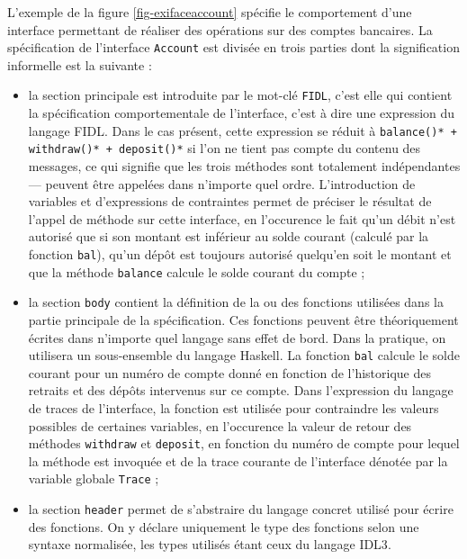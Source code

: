 L'exemple de la figure \ref{fig-exifaceaccount} sp\'ecifie le
comportement d'une interface permettant de r\'ealiser des
op\'erations sur des comptes bancaires. La
sp\'ecification de l'interface \texttt{Account} est divis\'ee en
trois parties dont la signification informelle est la suivante : 
\begin{itemize}
  \item la section principale est introduite par le mot-cl\'e
    \texttt{FIDL}, c'est elle qui contient la sp\'ecification
    comportementale de l'interface, c'est \`a dire une expression du
    langage \textsf{FIDL}. Dans le cas pr\'esent, cette expression se r\'eduit \`a
    \texttt{balance()* + withdraw()* + deposit()*}  si l'on ne tient pas
    compte du contenu des messages, ce qui signifie que les trois
    m\'ethodes sont totalement ind\'ependantes --- peuvent \^etre appel\'ees
    dans n'importe quel ordre. L'introduction de variables et
    d'expressions de contraintes permet de pr\'eciser le r\'esultat de
    l'appel de m\'ethode sur cette interface, en l'occurence le fait
    qu'un d\'ebit n'est autoris\'e que si son montant est inf\'erieur au solde
    courant (calcul\'e par la fonction \texttt{bal}), qu'un d\'ep\^ot est
    toujours autoris\'e quelqu'en soit le montant et que la m\'ethode
    \texttt{balance} calcule le solde courant du compte ;
  \item la section \texttt{body} contient la d\'efinition de la ou des fonctions
    utilis\'ees dans la partie principale de la sp\'ecification. Ces
    fonctions peuvent \^etre th\'eoriquement \'ecrites dans n'importe quel
    langage sans effet de bord. Dans la pratique, on utilisera un
    sous-ensemble du langage \textsf{Haskell}. La fonction \texttt{bal} calcule
    le solde courant pour un num\'ero de compte donn\'e en fonction
    de l'historique des retraits et des d\'ep\^ots intervenus sur ce
    compte. Dans l'expression du langage de traces de l'interface, la
    fonction est utilis\'ee pour contraindre les valeurs possibles
    de certaines variables, en l'occurence la valeur de retour des
    m\'ethodes \texttt{withdraw} et \texttt{deposit}, en fonction du
    num\'ero de compte pour lequel la m\'ethode est invoqu\'ee et
    de la trace courante de l'interface d\'enot\'ee par la variable
    globale \texttt{Trace} ;
  \item la section \texttt{header} permet de s'abstraire du langage
    concret utilis\'e pour \'ecrire des fonctions. On y d\'eclare uniquement le type des
    fonctions selon une syntaxe normalis\'ee, les types utilis\'es
    \'etant ceux du langage \textsf{IDL3}.
\end{itemize}

